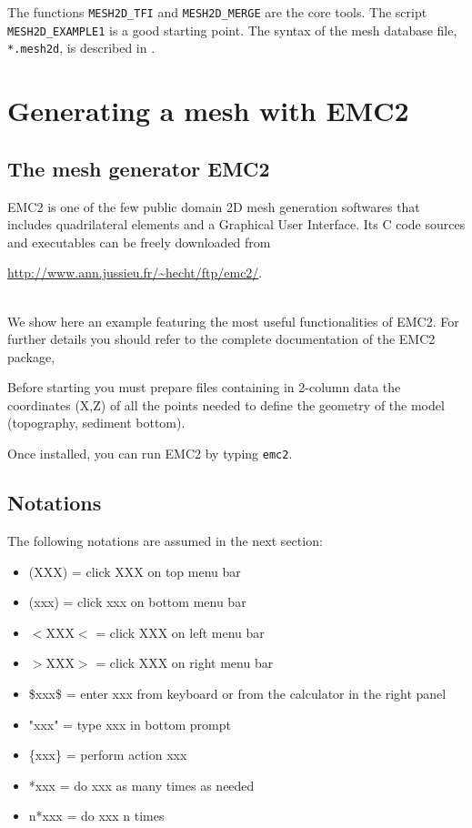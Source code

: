 The functions \texttt{MESH2D\_TFI} and \texttt{MESH2D\_MERGE} are the core tools.
The script \texttt{MESH2D\_EXAMPLE1} is a good starting point.
The syntax of the mesh database file, \texttt{*.mesh2d}, is described
in .

\section{Generating a mesh with EMC2}
\label{Sec:emc2}

\subsection{The mesh generator EMC2}

EMC2 is one of the few public domain 2D mesh generation softwares 
that includes quadrilateral elements and a Graphical User Interface. 
Its C code sources and executables can be freely downloaded from\\
\centerline{\url{http://www.ann.jussieu.fr/~hecht/ftp/emc2/}.}\\
We show here an example featuring the most useful functionalities of EMC2.
For further details you should refer to the complete documentation of
the EMC2 package,

Before starting you must prepare files containing in 2-column data 
the coordinates (X,Z)
of all the points needed to define the geometry of the model 
(topography, sediment bottom). 

Once installed, you can run EMC2 by typing \texttt{emc2}.

\subsection{Notations}

The following notations are assumed in the next section:
\begin{itemize}
\item  \textsf{(XXX)} = click XXX on top menu bar 
\item  \textsf{(xxx)} = click xxx on bottom menu bar
\item  \textsf{$<$XXX$<$} = click XXX on left menu bar
\item  \textsf{$>$XXX$>$} = click XXX on right menu bar
\item  \textsf{\$xxx\$} = enter xxx from keyboard or from the calculator in the right panel
\item  \textsf{"xxx"} = type xxx in bottom prompt
\item  \textsf{\{xxx\}} = perform action xxx
\item  \textsf{*xxx}  = do xxx as many times as needed
\item  \textsf{n*xxx} = do xxx n times
\end{itemize}

